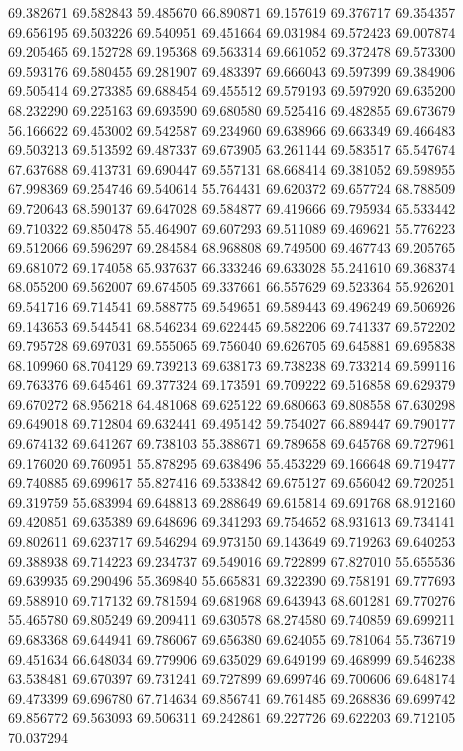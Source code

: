 69.382671
69.582843
59.485670
66.890871
69.157619
69.376717
69.354357
69.656195
69.503226
69.540951
69.451664
69.031984
69.572423
69.007874
69.205465
69.152728
69.195368
69.563314
69.661052
69.372478
69.573300
69.593176
69.580455
69.281907
69.483397
69.666043
69.597399
69.384906
69.505414
69.273385
69.688454
69.455512
69.579193
69.597920
69.635200
68.232290
69.225163
69.693590
69.680580
69.525416
69.482855
69.673679
56.166622
69.453002
69.542587
69.234960
69.638966
69.663349
69.466483
69.503213
69.513592
69.487337
69.673905
63.261144
69.583517
65.547674
67.637688
69.413731
69.690447
69.557131
68.668414
69.381052
69.598955
67.998369
69.254746
69.540614
55.764431
69.620372
69.657724
68.788509
69.720643
68.590137
69.647028
69.584877
69.419666
69.795934
65.533442
69.710322
69.850478
55.464907
69.607293
69.511089
69.469621
55.776223
69.512066
69.596297
69.284584
68.968808
69.749500
69.467743
69.205765
69.681072
69.174058
65.937637
66.333246
69.633028
55.241610
69.368374
68.055200
69.562007
69.674505
69.337661
66.557629
69.523364
55.926201
69.541716
69.714541
69.588775
69.549651
69.589443
69.496249
69.506926
69.143653
69.544541
68.546234
69.622445
69.582206
69.741337
69.572202
69.795728
69.697031
69.555065
69.756040
69.626705
69.645881
69.695838
68.109960
68.704129
69.739213
69.638173
69.738238
69.733214
69.599116
69.763376
69.645461
69.377324
69.173591
69.709222
69.516858
69.629379
69.670272
68.956218
64.481068
69.625122
69.680663
69.808558
67.630298
69.649018
69.712804
69.632441
69.495142
59.754027
66.889447
69.790177
69.674132
69.641267
69.738103
55.388671
69.789658
69.645768
69.727961
69.176020
69.760951
55.878295
69.638496
55.453229
69.166648
69.719477
69.740885
69.699617
55.827416
69.533842
69.675127
69.656042
69.720251
69.319759
55.683994
69.648813
69.288649
69.615814
69.691768
68.912160
69.420851
69.635389
69.648696
69.341293
69.754652
68.931613
69.734141
69.802611
69.623717
69.546294
69.973150
69.143649
69.719263
69.640253
69.388938
69.714223
69.234737
69.549016
69.722899
67.827010
55.655536
69.639935
69.290496
55.369840
55.665831
69.322390
69.758191
69.777693
69.588910
69.717132
69.781594
69.681968
69.643943
68.601281
69.770276
55.465780
69.805249
69.209411
69.630578
68.274580
69.740859
69.699211
69.683368
69.644941
69.786067
69.656380
69.624055
69.781064
55.736719
69.451634
66.648034
69.779906
69.635029
69.649199
69.468999
69.546238
63.538481
69.670397
69.731241
69.727899
69.699746
69.700606
69.648174
69.473399
69.696780
67.714634
69.856741
69.761485
69.268836
69.699742
69.856772
69.563093
69.506311
69.242861
69.227726
69.622203
69.712105
70.037294
